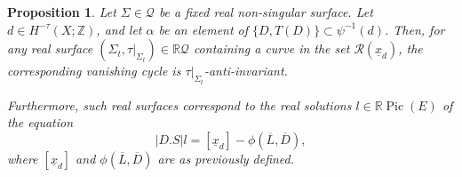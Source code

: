 \documentclass[10pt,a4paper]{article}
\numberwithin{equation}{section}
\theoremstyle{definition}
\theoremstyle{plain}
\newtheorem{proposition}[definition]{Proposition}
\theoremstyle{remark}
\newcommand{\R}{\mathbb{R}}
\newcommand{\Z}{\mathbb{Z}}
\DeclareMathOperator{\Pic}{Pic}
\begin{document}
\begin{proposition} \label{prop-corresponding.surface.picE}
Let $\Sigma \in \mathcal{Q}$ be a fixed real non-singular surface.
Let $d\in H^{-\tau}(X;\Z)$, and let $\alpha$ be an element of 
$\{D,T (D)\}\subset \psi^{-1}(d)$. Then, for any real surface $(\Sigma_t, \tau|_{\Sigma_t}) \in \mathbb{R} \mathcal{Q}$ containing a curve in the set $\mathcal{R}(\underline{x}_d)$, the corresponding vanishing cycle is $\tau|_{\Sigma_t}$-anti-invariant.

Furthermore, such real surfaces correspond to the real solutions $l\in \R \Pic(E)$ of the equation
\begin{equation}\label{eq-solutions.in.PicE}
    |D.S|l=[\underline{x}_d]-\phi\left(\overline{L},\overline{D}\right),
\end{equation}
where $[\underline{x}_d]$ and $\phi(\overline{L}, \overline{D})$  are as previously defined.
\end{proposition}
\end{document}
